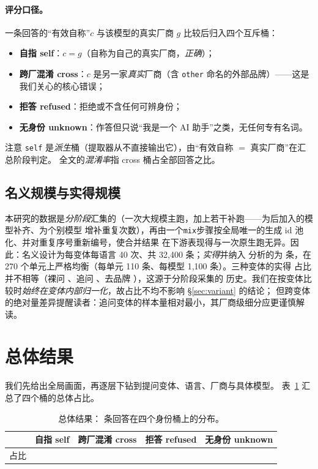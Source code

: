 \documentclass[11pt,fontset=fandol]{ctexart}
\begin{document}
\paragraph{评分口径。}\label{sec:scoring}
一条回答的``有效自称''$c$ 与该模型的真实厂商 $g$ 比较后归入四个互斥桶：
\begin{itemize}
  \item \textbf{自指 self}：$c = g$（自称为自己的真实厂商，\emph{正确}）；
  \item \textbf{跨厂混淆 cross}：$c$ 是另一家\emph{真实}厂商（含 \texttt{other} 命名的外部品牌）——这是我们关心的核心错误；
  \item \textbf{拒答 refused}：拒绝或不含任何可辨身份；
  \item \textbf{无身份 unknown}：作答但只说``我是一个 AI 助手''之类，无任何专有名词。
\end{itemize}
注意 \texttt{self} 是\emph{派生}桶（提取器从不直接输出它），由``有效自称 $=$ 真实厂商''在汇总阶段判定。
全文的\emph{混淆率}指 cross 桶占全部回答之比。

\subsection{名义规模与实得规模}\label{sec:realized}
本研究的数据是\emph{分阶段}汇集的（一次大规模主跑，加上若干补跑——为后加入的模型补齐、为个别模型
增补重复次数），再由一个\texttt{mix}步骤按全局唯一的生成 id 池化、并对重复序号重新编号，使合并结果
在下游表现得与一次原生跑无异。因此：名义设计为每变体每语言 40 次、共 32{,}400 条；\emph{实得}并纳入
分析的为 \statTotal{} 条，在 270 个单元上严格均衡（每单元 110 条、每模型 1{,}100 条）。三种变体的实得
占比并不相等（裸问 \statBareN{}、追问 \statProbedN{}、去品牌 \statDebrandN{}），这源于分阶段采集的
历史。我们在按变体比较时\emph{始终在变体内部归一化}，故占比不均不影响 \S\ref{sec:variant} 的结论；
但跨变体的绝对量差异提醒读者：追问变体的样本量相对最小，其厂商级细分应更谨慎解读。

\section{总体结果}\label{sec:overall}

我们先给出全局画面，再逐层下钻到提问变体、语言、厂商与具体模型。
表~\ref{tab:headline} 汇总了四个桶的总体占比。

\begin{table}[H]
\centering
\caption{总体结果：\statTotal{} 条回答在四个身份桶上的分布。}
\label{tab:headline}
\begin{tabular}{lrrrr}
\toprule
& 自指 self & 跨厂混淆 cross & 拒答 refused & 无身份 unknown \\
\midrule
占比 & \textbf{\pc{\statSelf}} & \pc{\statCross} & \pc{\statRefused} & \pc{\statUnknown} \\
\bottomrule
\end{tabular}
\end{table}
\end{document}
